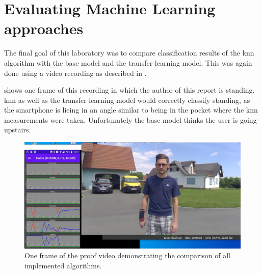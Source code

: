 \section{Evaluating Machine Learning approaches}
\label{sec:resultsML}
The final goal of this laboratory was to compare classification results of the \gls{knn} algorithm with the base model and the transfer learning model. This was again done using a video recording as described in .

 shows one frame of this recording in which the author of this report is standing. \gls{knn} as well as the transfer learning model would correctly classify standing, as the smartphone is lieing in an angle similar to being in the pocket where the \gls{knn} measurements were taken. Unfortunately the base model thinks the user is going upstairs.
\begin{figure}[htpb]
\centering
\includegraphics[width=\linewidth]{all_screenshot}
\caption{One frame of the proof video demonstrating the comparison of all implemented algorithms.}
\label{myfig:all_screenshot}
\end{figure}

